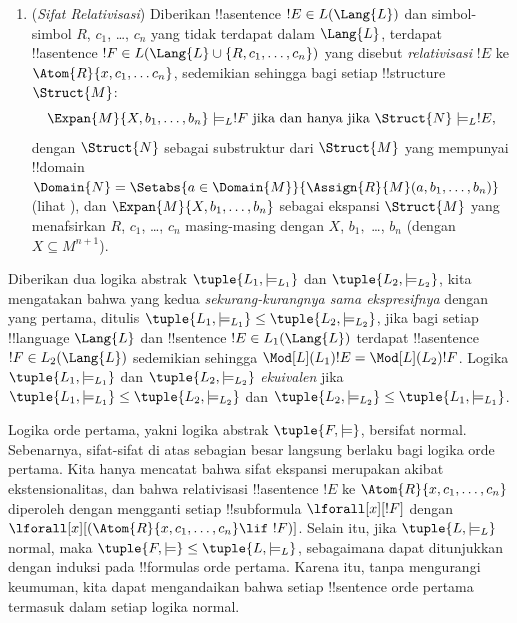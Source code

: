 \documentclass[../../../include/open-logic-section]{subfiles}
\begin{document}
\begin{defn}
\begin{enumerate}
  kepada~$c$.
\item (\emph{Sifat Relativisasi}) Diberikan !!a{sentence} $!E \in
  L(\Lang{L})$ dan simbol-simbol $R$, $c_1$, \dots, $c_n$ yang tidak
  terdapat dalam $\Lang{L}$, terdapat !!a{sentence} $!F \in L(\Lang{L}
  \cup \{R,c_1,\ldots,c_n\})$ yang disebut \emph{relativisasi} $!E$ ke
  $\Atom{R}{x, c_1, \dots c_n}$, sedemikian sehingga bagi setiap
  !!{structure}~$\Struct{M}$:
  \[
  \Expan{M}{X, b_1, \ldots, b_n} \models_L !F \text{ jika dan
    hanya jika } \Struct{N} \models_L !E,
  \]
  dengan $\Struct{N}$ sebagai substruktur dari $\Struct{M}$ yang mempunyai
  !!{domain} $\Domain{N} = \Setabs{a\in \Domain{M}}{\Assign{R}{M}(a, b_1,
  \dots, b_n)}$ (lihat ), dan
  $\Expan{M}{X, b_1, \ldots, b_n}$ sebagai ekspansi $\Struct{M}$ yang
  menafsirkan $R$, $c_1$, \dots, $c_n$ masing-masing dengan $X$, $b_1,$
  \dots, $b_n$ (dengan $X \subseteq M^{n+1}$).
\end{enumerate}
\end{defn}

\begin{defn}
Diberikan dua logika abstrak $\tuple{L_1, \models_{L_1}}$ dan
$\tuple{L_2, \models_{L_2}}$, kita mengatakan bahwa yang kedua
\emph{sekurang-kurangnya sama ekspresifnya} dengan yang pertama, ditulis
$\tuple{L_1, \models_{L_1}} \leq \tuple{L_2, \models_{L_2}}$, jika bagi
setiap !!{language} $\Lang{L}$ dan !!{sentence} $!E \in L_1(\Lang{L})$
terdapat !!a{sentence} $!F \in L_2(\Lang{L})$ sedemikian sehingga
$\Mod[L](L_1){!E} = \Mod[L](L_2){!F}$. Logika $\tuple{L_1,
\models_{L_1}}$ dan $\tuple{L_2, \models_{L_2}}$ \emph{ekuivalen} jika
$\tuple{L_1, \models_{L_1}} \leq \tuple{L_2, \models_{L_2}}$ dan
$\tuple{L_2, \models_{L_2}} \leq \tuple{L_1, \models_{L_1}}$.
\end{defn}

\begin{rem}
  Logika orde pertama, yakni logika abstrak $\tuple{F, \models}$, bersifat
  normal. Sebenarnya, sifat-sifat di atas sebagian besar langsung berlaku
  bagi logika orde pertama. Kita hanya mencatat bahwa sifat ekspansi merupakan
  akibat ekstensionalitas, dan bahwa relativisasi !!a{sentence} $!E$ ke
  $\Atom{R}{x, c_1, \dots, c_n}$ diperoleh dengan mengganti setiap
  !!{subformula} $\lforall[x][!F]$ dengan
  $\lforall[x][(\Atom{R}{x, c_1, \dots, c_n} \lif \ !F)]$. Selain itu,
  jika $\tuple{L, \models_L}$ normal, maka $\tuple{F, \models} \leq
  \tuple{L, \models_{L}}$, sebagaimana dapat ditunjukkan dengan induksi
  pada !!{formula}s orde pertama. Karena itu, tanpa mengurangi keumuman, kita
  dapat mengandaikan bahwa setiap !!{sentence} orde pertama termasuk dalam
  setiap logika normal.
\end{rem}
\end{document}

